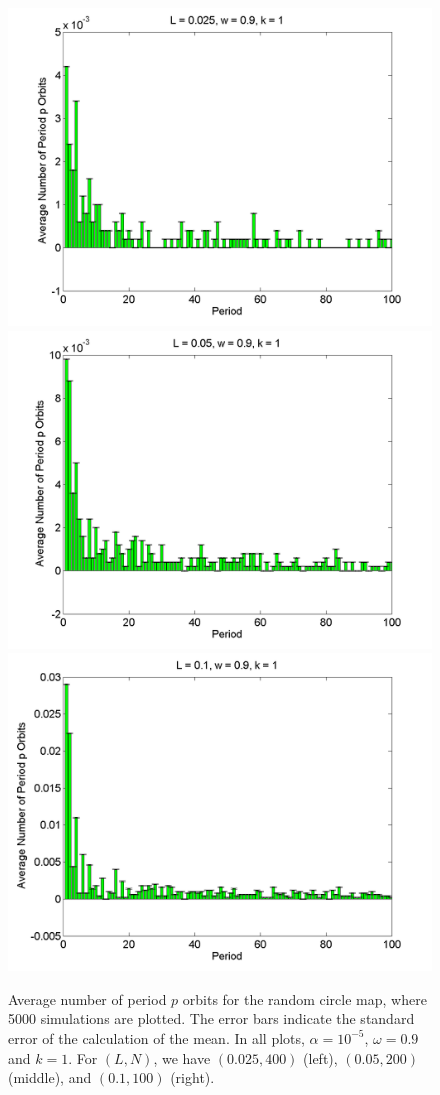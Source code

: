 \begin{figure}[H]\linespread{1}
\caption[Average number of period $p$ orbits for the random circle
map (uniform distribution), for $\alpha = 10^{-5}$, $\omega=0.9$ and $k=1$]{Average number of period $p$ orbits for the random circle
map, where 5000 simulations are plotted. The error bars indicate
the standard error of the calculation of the mean. In all plots,
$\alpha = 10^{-5}$, $\omega=0.9$ and $k=1$. For $(L,N)$,
we have $(0.025, 400)$ (left), $(0.05, 200)$
(middle), and $(0.1, 100)$ (right).}\label{fig:rcirchist_u_ma1}
	\begin{center}
\includegraphics[width=.33\textwidth]{figs/rcirc_hist_u_L_0025_w_09_k_1_sims_5000.png}\hfill
\includegraphics[width=.33\textwidth]{figs/rcirc_hist_u_L_005_w_09_k_1_sims_5000.png}\hfill
\includegraphics[width=.33\textwidth]{figs/rcirc_hist_u_L_01_w_09_k_1_sims_5000.png}
	\end{center}
\end{figure}

